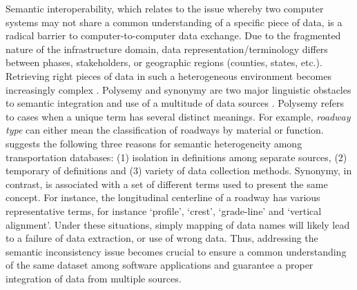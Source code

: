 \documentclass[Journal, BackFigs, DoubleSpace]{ascelike}%
\begin{document}
Semantic interoperability, which relates to the issue whereby two computer systems may not share a common understanding of a specific piece of data, is a radical barrier to computer-to-computer data exchange. Due to the fragmented nature of the infrastructure domain, data representation/terminology differs between phases, stakeholders, or geographic regions (counties, states, etc.). Retrieving right pieces of data in such a heterogeneous environment becomes increasingly complex \cite{karimi2003semantic}. Polysemy and synonymy are two major linguistic obstacles to semantic integration and use of a multitude of data sources \cite{noy04}. Polysemy refers to cases when a unique term has several distinct meanings. For example, \textit{roadway type} can either mean the classification of roadways by material or function.  suggests the following three reasons for semantic heterogeneity among transportation databases: (1) isolation in definitions among separate sources, (2) temporary of definitions and (3) variety of data collection methods. Synonymy, in contrast, is associated with a set of different terms used to present the same concept. For instance, the longitudinal centerline of a roadway has various representative terms, for instance `profile', `crest', `grade-line' and `vertical alignment'. Under these situations, simply mapping of data names will likely lead to a failure of data extraction, or use of wrong data. Thus, addressing the semantic inconsistency issue becomes crucial to ensure a common understanding of the same dataset among software applications and guarantee a proper integration of data from multiple sources. 
\par
%
\end{document}
